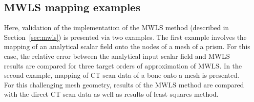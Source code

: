 \documentclass[11pt]{acmeArticle}
\numberwithin{equation}{section}
\begin{document}
\subsection{MWLS mapping examples}
\label{sec:mals_mapping}
Here, validation of the implementation of the MWLS method (described in Section~\ref{sec:mwls}) is presented via two examples.
The first example involves the mapping of an analytical scalar field onto the nodes of a mesh of a prism.
For this case, the relative error between the analytical input scalar field and MWLS results are compared for three target orders of approximation of MWLS.
In the second example, mapping of CT scan data of a bone onto a mesh is presented.
For this challenging mesh geometry, results of the MWLS method are compared with the direct CT scan data as well as results of least squares method.
    
\end{document}

